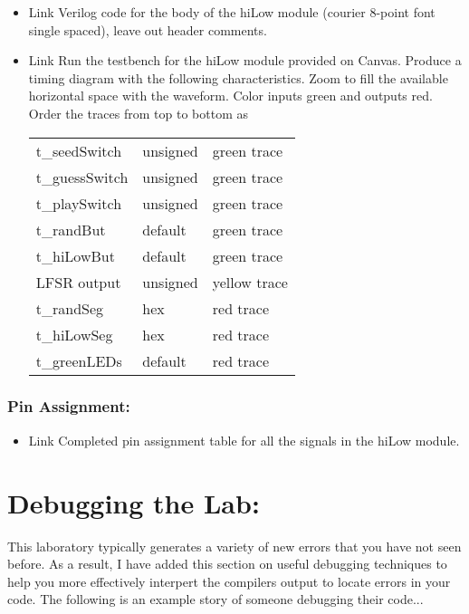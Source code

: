 \begin{itemize}
\item
  Link Verilog code for the body of the hiLow module (courier 8-point
  font single spaced), leave out header comments.
\item
  Link Run the testbench for the hiLow module provided on Canvas.
  Produce a timing diagram with the following characteristics. Zoom to
  fill the available horizontal space with the waveform. Color inputs
  green and outputs red. Order the traces from top to bottom as

\begin{tabular}{p{4cm}p{4cm}p{4cm}}
    t\_seedSwitch & unsigned  & green trace \\
    t\_guessSwitch & unsigned & green trace \\
    t\_playSwitch & unsigned & green trace \\
    t\_randBut & default & green trace \\
    t\_hiLowBut & default & green trace \\
    LFSR output & unsigned & yellow trace\\
    t\_randSeg & hex & red trace \\
    t\_hiLowSeg & hex & red trace \\
    t\_greenLEDs & default & red trace \\
  \end{tabular}
\end{itemize}

\subsubsection{Pin Assignment:}

\begin{itemize}
\item
  Link Completed pin assignment table for all the signals in the hiLow
  module.
\end{itemize}


\section{Debugging the Lab:}
This laboratory typically generates a variety of new errors that you 
have not seen before.  As a result, I have added this section on 
useful debugging techniques to help you more effectively 
interpert the compilers output to locate errors in your code.
The following is an example story of someone debugging their code...

